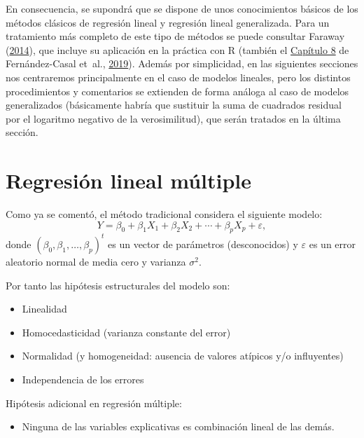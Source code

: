 \documentclass[
  spanish,
]{book}
\providecommand{\tightlist}{%
  \setlength{\itemsep}{0pt}\setlength{\parskip}{0pt}}
\theoremstyle{break}
\theoremstyle{definition}
\theoremstyle{definition}
\theoremstyle{definition}
\theoremstyle{remark}
\begin{document}
En consecuencia, se supondrá que se dispone de unos conocimientos básicos de los métodos clásicos de regresión lineal y regresión lineal generalizada.
Para un tratamiento más completo de este tipo de métodos se puede consultar Faraway (\protect\hyperlink{ref-faraway2014linear}{2014}), que incluye su aplicación en la práctica con R (también el \href{https://rubenfcasal.github.io/intror/modelos-lineales.html}{Capítulo 8} de Fernández-Casal et~al., \protect\hyperlink{ref-fernandez2019intror}{2019}).
Además por simplicidad, en las siguientes secciones nos centraremos principalmente en el caso de modelos lineales, pero los distintos procedimientos y comentarios se extienden de forma análoga al caso de modelos generalizados (básicamente habría que sustituir la suma de cuadrados residual por el logaritmo negativo de la verosimilitud), que serán tratados en la última sección.

\hypertarget{reg-multiple}{%
\section{Regresión lineal múltiple}\label{reg-multiple}}

Como ya se comentó, el método tradicional considera el siguiente modelo:
\begin{equation} 
  Y = \beta_{0}+\beta_{1}X_{1}+\beta_{2}X_{2}+\cdots+\beta_{p}X_{p} + \varepsilon,
  \label{eq:modelo-rlm}
\end{equation}
donde \(\left( \beta_{0},\beta_{1},\ldots,\beta_{p}\right)^t\) es un vector de parámetros (desconocidos) y \(\varepsilon\) es un error aleatorio normal de media cero y varianza \(\sigma^2\).

Por tanto las hipótesis estructurales del modelo son:

\begin{itemize}
\item
  Linealidad
\item
  Homocedasticidad (varianza constante del error)
\item
  Normalidad (y homogeneidad: ausencia de valores atípicos y/o influyentes)
\item
  Independencia de los errores
\end{itemize}

Hipótesis adicional en regresión múltiple:

\begin{itemize}
\tightlist
\item
  Ninguna de las variables explicativas es combinación lineal de las demás.
\end{itemize}
\end{document}
